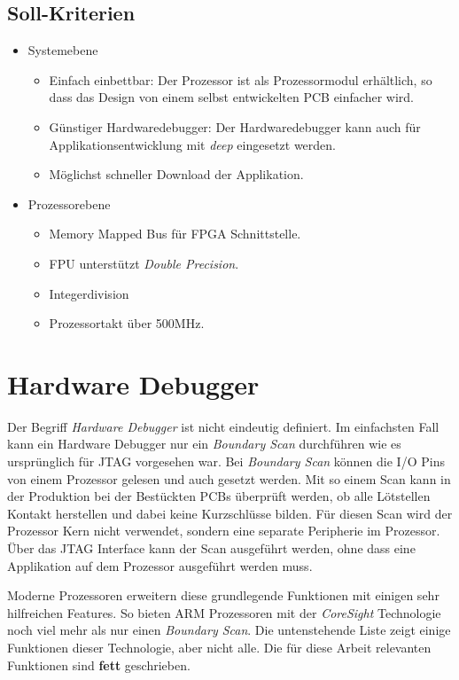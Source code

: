 \subsection{Soll-Kriterien}
\begin{itemize}
\item Systemebene
	\begin{itemize}
	\item Einfach einbettbar: Der Prozessor ist als Prozessormodul erhältlich, so dass das Design von einem selbst entwickelten PCB einfacher wird.
	\item Günstiger Hardwaredebugger: Der Hardwaredebugger kann auch für Applikationsentwicklung mit \textit{deep} eingesetzt werden.
	\item Möglichst schneller Download der Applikation.
	\end{itemize}
\item Prozessorebene
	\begin{itemize}
	\item Memory Mapped Bus für FPGA Schnittstelle.
	\item FPU unterstützt \textit{Double Precision}.
	\item Integerdivision
	\item Prozessortakt über 500MHz.
	\end{itemize}
\end{itemize}


\section{Hardware Debugger}
Der Begriff \textit{Hardware Debugger} ist nicht eindeutig definiert.
Im einfachsten Fall kann ein Hardware Debugger nur ein \textit{Boundary Scan} durchführen wie es ursprünglich für JTAG vorgesehen war.
Bei \textit{Boundary Scan} können die I/O Pins von einem Prozessor gelesen und auch gesetzt werden.
Mit so einem Scan kann in der Produktion bei der Bestückten PCBs überprüft werden, ob alle Lötstellen Kontakt herstellen und dabei keine Kurzschlüsse bilden.
Für diesen Scan wird der Prozessor Kern nicht verwendet, sondern eine separate Peripherie im Prozessor.
Über das JTAG Interface kann der Scan ausgeführt werden, ohne dass eine Applikation auf dem Prozessor ausgeführt werden muss.

Moderne Prozessoren erweitern diese grundlegende Funktionen mit einigen sehr hilfreichen Features.
So bieten ARM Prozessoren mit der \textit{CoreSight} Technologie noch viel mehr als nur einen \textit{Boundary Scan}.
Die untenstehende Liste zeigt einige Funktionen dieser Technologie, aber nicht alle.
Die für diese Arbeit relevanten Funktionen sind \textbf{fett} geschrieben.

